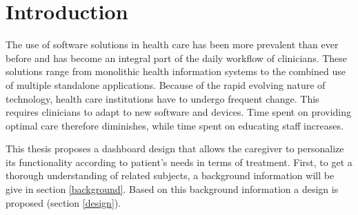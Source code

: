 \section{Introduction}

The use of software solutions in health care has been more prevalent than ever before and has become an integral part of the daily workflow of clinicians. These solutions range from monolithic health information systems to the combined use of multiple standalone applications. Because of the rapid evolving nature of technology, health care institutions have to undergo frequent change. This requires clinicians to adapt to new software and devices. Time spent on providing optimal care therefore diminishes, while time spent on educating staff increases.



This thesis proposes a dashboard design that allows the caregiver to personalize its functionality according to patient's needs in terms of treatment. First, to get a thorough understanding of related subjects, a background information will be give in section \ref{background}. Based on this background information a design is proposed (section \ref{design}).